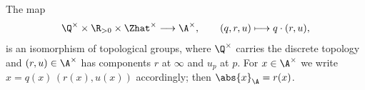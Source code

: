 The map
\[
  \Q^\times\times\R_{>0}\times\Zhat^\times\longrightarrow\A^\times,\qquad(q,r,u)\longmapsto q\cdot(r,u),
\]
is an isomorphism of topological groups, where $\Q^\times$ carries the discrete topology and $(r,u)\in\A^\times$ has
components $r$ at $\infty$ and $u_p$ at $p$. For $x\in\A^\times$ we write $x=q(x)\,(r(x),u(x))$ accordingly; then
$\abs{x}_\A=r(x)$.
